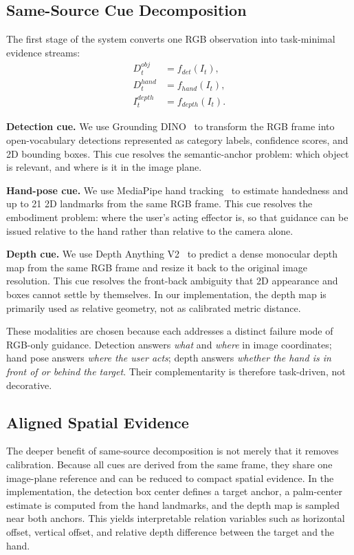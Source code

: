 \documentclass[10pt,twocolumn,letterpaper]{article}
\begin{document}
\subsection{Same-Source Cue Decomposition}
The first stage of the system converts one RGB observation into task-minimal evidence streams:
\begin{equation}
\begin{aligned}
D_t^{obj} &= f_{det}(I_t), \\
D_t^{hand} &= f_{hand}(I_t), \\
I_t^{depth} &= f_{depth}(I_t).
\end{aligned}
\end{equation}

\textbf{Detection cue.} We use Grounding DINO~\cite{liu2023groundingdino} to transform the RGB frame into open-vocabulary detections represented as category labels, confidence scores, and 2D bounding boxes. This cue resolves the semantic-anchor problem: which object is relevant, and where is it in the image plane.

\textbf{Hand-pose cue.} We use MediaPipe hand tracking~\cite{lugaresi2019mediapipe} to estimate handedness and up to 21 2D landmarks from the same RGB frame. This cue resolves the embodiment problem: where the user's acting effector is, so that guidance can be issued relative to the hand rather than relative to the camera alone.

\textbf{Depth cue.} We use Depth Anything V2~\cite{yang2024depthanythingv2} to predict a dense monocular depth map from the same RGB frame and resize it back to the original image resolution. This cue resolves the front-back ambiguity that 2D appearance and boxes cannot settle by themselves. In our implementation, the depth map is primarily used as relative geometry, not as calibrated metric distance.

These modalities are chosen because each addresses a distinct failure mode of RGB-only guidance. Detection answers \emph{what} and \emph{where} in image coordinates; hand pose answers \emph{where the user acts}; depth answers \emph{whether the hand is in front of or behind the target}. Their complementarity is therefore task-driven, not decorative.

\subsection{Aligned Spatial Evidence}
The deeper benefit of same-source decomposition is not merely that it removes calibration. Because all cues are derived from the same frame, they share one image-plane reference and can be reduced to compact spatial evidence. In the implementation, the detection box center defines a target anchor, a palm-center estimate is computed from the hand landmarks, and the depth map is sampled near both anchors. This yields interpretable relation variables such as horizontal offset, vertical offset, and relative depth difference between the target and the hand.
\end{document}
